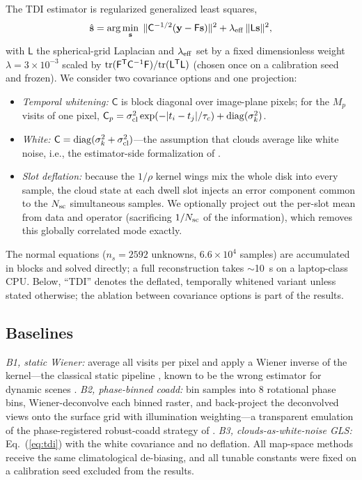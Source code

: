 ﻿\documentclass[twocolumn]{emulateapj}
\begin{document}
The TDI estimator is regularized generalized least squares,
\begin{equation}
\hat{\mathbf{s}}=\arg\min_{\mathbf{s}}\;
\|\mathsf{C}^{-1/2}(\mathbf{y}-\mathsf{F}\mathbf{s})\|^2
+\lambda_{\rm eff}\,\|\mathsf{L}\mathbf{s}\|^2,
\label{eq:tdi}
\end{equation}
with $\mathsf{L}$ the spherical-grid Laplacian and
$\lambda_{\rm eff}$ set by a fixed dimensionless weight
$\lambda=3\times10^{-3}$ scaled by ${\rm tr}(\mathsf{F}^{\sf T}
\mathsf{C}^{-1}\mathsf{F})/{\rm tr}(\mathsf{L}^{\sf T}\mathsf{L})$
(chosen once on a calibration seed and frozen). We consider two
covariance options and one projection:
\begin{itemize}
\item {\it Temporal whitening:} $\mathsf{C}$ is block diagonal over
image-plane pixels; for the $M_p$ visits of one pixel,
$\mathsf{C}_p=\sigma_{\rm cl}^2\exp(-|t_i-t_j|/\tau_c)
+\mathrm{diag}(\sigma_k^2)$.
\item {\it White:} $\mathsf{C}=\mathrm{diag}
(\sigma_k^2+\sigma_{\rm cl}^2)$---the assumption that clouds average
like white noise, i.e., the estimator-side formalization of
\citet{toth25clouds}.
\item {\it Slot deflation:} because the $1/\rho$ kernel wings mix the
whole disk into every sample, the cloud state at each dwell slot injects
an error component common to the $N_{\rm sc}$ simultaneous samples. We
optionally project out the per-slot mean from data and operator
(sacrificing $1/N_{\rm sc}$ of the information), which removes this
globally correlated mode exactly.
\end{itemize}
The normal equations ($n_s=2592$ unknowns, $6.6\times10^4$ samples) are
accumulated in blocks and solved directly; a full reconstruction takes
$\sim$10~s on a laptop-class CPU. Below, ``TDI'' denotes the deflated,
temporally whitened variant unless stated otherwise; the ablation between
covariance options is part of the results.

\subsection{Baselines}
{\it B1, static Wiener:} average all visits per pixel and apply a Wiener
inverse of the kernel---the classical static pipeline
\citep{toth21}, known to be the wrong estimator for dynamic scenes
\citep{tur26bench}. {\it B2, phase-binned coadd:} bin samples into 8
rotational phase bins, Wiener-deconvolve each binned raster, and
back-project the deconvolved views onto the surface grid with
illumination weighting---a transparent emulation of the
phase-registered robust-coadd strategy of \citet{tur26bench}.
{\it B3, clouds-as-white-noise GLS:} Eq.~(\ref{eq:tdi}) with the white
covariance and no deflation. All map-space methods receive the same
climatological de-biasing, and all tunable constants were fixed on a
calibration seed excluded from the results.
\end{document}

